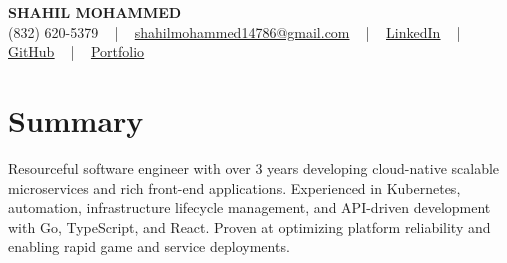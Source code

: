 \documentclass[letterpaper,10pt]{article}
\begin{document}
\begin{center}
    {\fontsize{14pt}{12pt}\selectfont \textbf{\MakeUppercase{Shahil Mohammed}}}\\ \vspace{2pt}
    \fontsize{10pt}{12pt}\selectfont (832) 620-5379 ~ | ~ \href{mailto:shahilmohammed14786@gmail.com}{shahilmohammed14786@gmail.com} ~ | ~  
    \href{https://www.linkedin.com/in/shahil-mohammed-9652931a1/}{\color{blue}\underline{LinkedIn}}  ~ | ~ 
    \href{https://github.com/freakbeast14}{\color{blue}\underline{GitHub}} ~ | ~ 
    \href{https://shahil-mohammed.netlify.app/}{\color{blue}\underline{Portfolio}}
    \vspace{-8pt}
\end{center}

\section{Summary}
\vspace{-2pt}\fontsize{8pt}{9pt}\selectfont
Resourceful software engineer with over 3 years developing cloud-native scalable microservices and rich front-end applications. Experienced in Kubernetes, automation, infrastructure lifecycle management, and API-driven development with Go, TypeScript, and React. Proven at optimizing platform reliability and enabling rapid game and service deployments.
\vspace{-5pt}

\vspace{-2pt}
\end{document}

